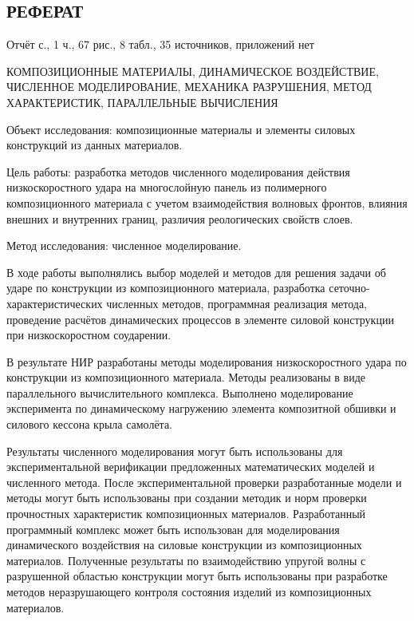\begin{center}\section*{РЕФЕРАТ}\end{center}

Отчёт с., 1 ч., 67 рис., 8 табл., 35 источников, приложений нет

КОМПОЗИЦИОННЫЕ МАТЕРИАЛЫ, ДИНАМИЧЕСКОЕ ВОЗДЕЙСТВИЕ, ЧИСЛЕННОЕ МОДЕЛИРОВАНИЕ, МЕХАНИКА РАЗРУШЕНИЯ, МЕТОД ХАРАКТЕРИСТИК, ПАРАЛЛЕЛЬНЫЕ ВЫЧИСЛЕНИЯ

Объект исследования: композиционные материалы и элементы силовых конструкций из данных материалов.

Цель работы: разработка методов численного моделирования действия низкоскоростного удара на многослойную панель из полимерного композиционного материала с учетом взаимодействия волновых фронтов, влияния внешних и внутренних границ, различия реологических свойств слоев.

Метод исследования: численное моделирование.

В ходе работы выполнялись выбор моделей и методов для решения задачи об ударе по конструкции из композиционного материала, разработка сеточно-характеристических численных методов, программная реализация метода, проведение расчётов динамических процессов в элементе силовой конструкции при низкоскоростном соударении.

В результате НИР разработаны методы моделирования низкоскоростного удара по конструкции из композиционного материала. Методы реализованы в виде параллельного вычислительного комплекса. Выполнено моделирование эксперимента по динамическому нагружению элемента композитной обшивки и силового кессона крыла самолёта. 

Результаты численного моделирования могут быть использованы для экспериментальной верификации предложенных математических моделей и численного метода. После экспериментальной проверки разработанные модели и методы могут быть использованы при создании методик и норм проверки прочностных характеристик композиционных материалов. Разработанный программный комплекс может быть использован для моделирования динамического воздействия на силовые конструкции из композиционных материалов. Полученные результаты по взаимодействию упругой волны с разрушенной областью конструкции могут быть использованы при разработке методов неразрушающего контроля состояния изделий из композиционных материалов.
